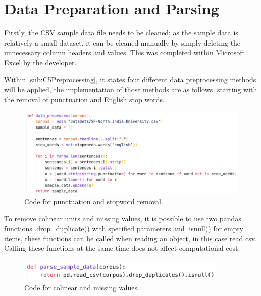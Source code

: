 \section{Data Preparation and Parsing}

Firstly, the CSV sample data file needs to be cleaned; as the sample data is relatively a small dataset, it can be cleaned manually by simply deleting the unnecessary column headers and values. This was completed within Microsoft Excel by the developer.

Within \autoref{sub:C5Preprocessing}, it states four different data preprocessing methods will be applied, the implementation of those methods are as follows, starting with the removal of punctuation and English stop words.

\begin{figure}[H]
    \centering
    \includegraphics[width=\textwidth]{figures/chapter-6/data_preprocess.png}
    \caption[Code for punctuation and stopword removal]{Code for punctuation and stopword removal.
    \label{fig:data_preprocess}}
\end{figure}

\newpage

To remove colinear units and missing values, it is possible to use two pandas functions .drop\_duplicate() with specified parameters and .isnull() for empty items, these functions can be called when reading an object, in this case read csv. Calling these functions at the same time does not affect computational cost.

\begin{figure}[H]
    \centering
    \includegraphics[width=0.9\textwidth]{figures/chapter-6/parse_sample.png}
    \caption[Code for colinear and missing values]{Code for colinear and missing values.
    \label{fig:parse_sample}}
\end{figure}

